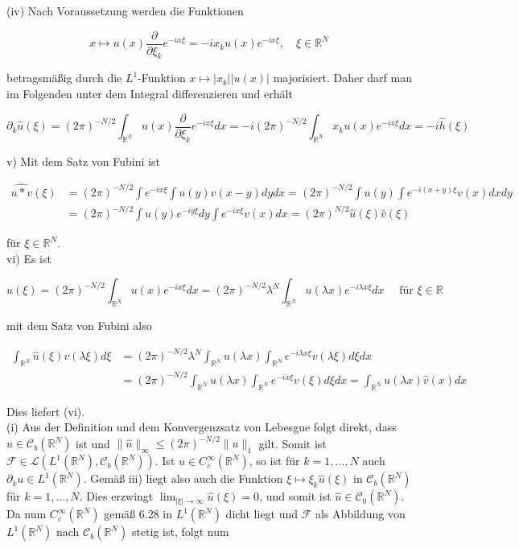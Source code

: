 \documentclass[10pt, letterpaper]{article}
\begin{document}
(iv) Nach Voraussetzung werden die Funktionen

$$
x \mapsto u(x) \frac{\partial}{\partial \xi_{k}} e^{-i x \xi}=-i x_{k} u(x) e^{-i x \xi}, \quad \xi \in \mathbb{R}^{N}
$$

betragsmäßig durch die $L^{1}$-Funktion $x \mapsto\left|x_{k}\right||u(x)|$ majorisiert. Daher darf man im Folgenden unter dem Integral differenzieren und erhält

$$
\partial_{k} \hat{u}(\xi)=(2 \pi)^{-N / 2} \int_{\mathbb{R}^{N}} u(x) \frac{\partial}{\partial \xi_{k}} e^{-i x \xi} d x=-i(2 \pi)^{-N / 2} \int_{\mathbb{R}^{N}} x_{k} u(x) e^{-i x \xi} d x=-i \hat{h}(\xi)
$$

v) Mit dem Satz von Fubini ist

$$
\begin{aligned}
\widehat{u * v}(\xi) & =(2 \pi)^{-N / 2} \int e^{-i x \xi} \int u(y) v(x-y) d y d x=(2 \pi)^{-N / 2} \int u(y) \int e^{-i(x+y) \xi} v(x) d x d y \\
& =(2 \pi)^{-N / 2} \int u(y) e^{-i y \xi} d y \int e^{-i x \xi} v(x) d x=(2 \pi)^{N / 2} \hat{u}(\xi) \hat{v}(\xi)
\end{aligned}
$$

für $\xi \in \mathbb{R}^{N}$.\\
vi) Es ist

$$
\hat{u}(\xi)=(2 \pi)^{-N / 2} \int_{\mathbb{R}^{N}} u(x) e^{-i x \xi} d x=(2 \pi)^{-N / 2} \lambda^{N} \int_{\mathbb{R}^{N}} u(\lambda x) e^{-i \lambda x \xi} d x \quad \text { für } \xi \in \mathbb{R}
$$

mit dem Satz von Fubini also

$$
\begin{aligned}
\int_{\mathbb{R}^{N}} \hat{u}(\xi) v(\lambda \xi) d \xi & =(2 \pi)^{-N / 2} \lambda^{N} \int_{\mathbb{R}^{N}} u(\lambda x) \int_{\mathbb{R}^{N}} e^{-i \lambda x \xi} v(\lambda \xi) d \xi d x \\
& =(2 \pi)^{-N / 2} \int_{\mathbb{R}^{N}} u(\lambda x) \int_{\mathbb{R}^{N}} e^{-i x \xi} v(\xi) d \xi d x=\int_{\mathbb{R}^{N}} u(\lambda x) \hat{v}(x) d x
\end{aligned}
$$

Dies liefert (vi).\\
(i) Aus der Definition und dem Konvergenzsatz von Lebesgue folgt direkt, dass $\hat{u} \in \mathcal{C}_{b}\left(\mathbb{R}^{N}\right)$ ist und $\|\hat{u}\|_{\infty} \leq(2 \pi)^{-N / 2}\|u\|_{1}$ gilt. Somit ist $\mathcal{F} \in \mathcal{L}\left(L^{1}\left(\mathbb{R}^{N}\right), \mathcal{C}_{b}\left(\mathbb{R}^{N}\right)\right)$. Ist $u \in C_{c}^{\infty}\left(\mathbb{R}^{N}\right)$, so ist für $k=1, \ldots, N$ auch $\partial_{k} u \in L^{1}\left(\mathbb{R}^{N}\right)$. Gemäß iii) liegt also auch die Funktion $\xi \mapsto \xi_{k} \hat{u}(\xi)$ in $\mathcal{C}_{b}\left(\mathbb{R}^{N}\right)$ für $k=1, \ldots, N$. Dies erzwingt $\lim _{|\xi| \rightarrow \infty} \hat{u}(\xi)=0$, und somit ist $\hat{u} \in \mathcal{C}_{0}\left(\mathbb{R}^{N}\right)$. Da num $C_{c}^{\infty}\left(\mathbb{R}^{N}\right)$ gemäß 6.28 in $L^{1}\left(\mathbb{R}^{N}\right)$ dicht liegt und $\mathcal{F}$ als Abbildung von $L^{1}\left(\mathbb{R}^{N}\right)$ nach $\mathcal{C}_{b}\left(\mathbb{R}^{N}\right)$ stetig ist, folgt num
\end{document}
